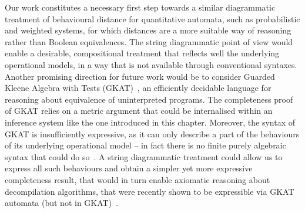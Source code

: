 Our work constitutes a necessary first step towards a similar diagrammatic treatment of behavioural distance for quantitative automata, such as probabilistic and weighted systems, for which distances are a more suitable way of reasoning rather than Boolean equivalences. The string diagrammatic point of view would enable a desirable, compositional treatment that reflects well the underlying operational models, in a way that is not available through conventional syntaxes. Another promising direction for future work would be to consider Guarded Kleene Algebra with Tests (GKAT)~\cite{Smolka:2020:Guarded,Schmid:2021:Guarded}, an efficiently decidable language for reasoning about equivalence of uninterpreted programs. The completeness proof of GKAT relies on a metric argument that could be internalised within an inference system like the one introduced in this chapter. Moreover, the syntax of GKAT is insufficiently expressive, as it can only describe a part of the behaviours of its underlying operational model -- in fact there is no finite purely algebraic syntax that could do so~\cite{Cate:2025:Algebras}. A string diagrammatic treatment could allow us to express all such behaviours and obtain a simpler yet more expressive completeness result, that would in turn enable axiomatic reasoning about decompilation algorithms, that were recently shown to be expressible via GKAT automata (but not in GKAT)~\cite{Zhang:2025:CFGKAT}.
 